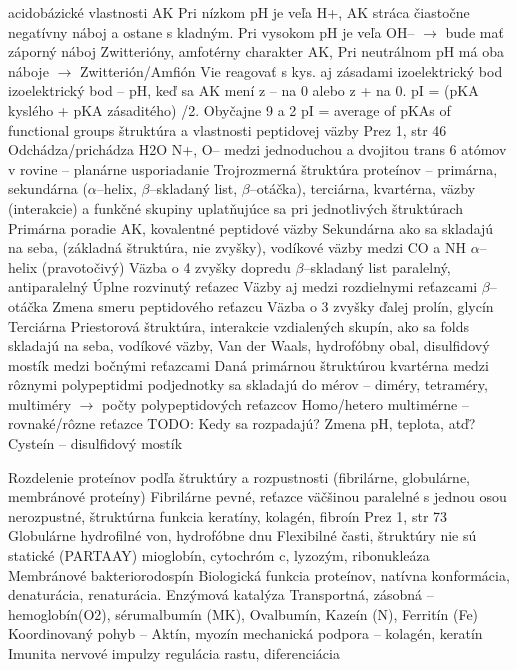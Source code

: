 acidobázické vlastnosti AK
Pri nízkom pH je veľa H+, AK stráca čiastočne negatívny náboj a ostane s kladným. 
Pri vysokom pH je veľa OH-- $\rightarrow$ bude mať záporný náboj
Zwitterióny, amfotérny charakter AK, 
Pri neutrálnom pH má oba náboje $\rightarrow$ Zwitterión/Amfión
Vie reagovať s kys. aj zásadami
izoelektrický bod                   
izoelektrický bod -- pH, keď sa AK mení z -- na 0 alebo z + na 0.
    pI = (pKA kyslého + pKA zásaditého) /2. Obyčajne 9 a 2
    pI = average of pKAs of functional groups
štruktúra a vlastnosti peptidovej väzby
Prez 1, str 46
Odchádza/prichádza H2O
N+, O--
medzi jednoduchou a dvojitou
trans
6 atómov v rovine -- planárne usporiadanie
Trojrozmerná štruktúra proteínov -- primárna, sekundárna ($\alpha$--helix, $\beta$--skladaný list, $\beta$--otáčka), terciárna, kvartérna, 
väzby (interakcie) a funkčné skupiny uplatňujúce sa pri jednotlivých štruktúrach
Primárna
poradie AK, kovalentné peptidové väzby
Sekundárna
ako sa skladajú na seba, (základná štruktúra, nie zvyšky), vodíkové väzby medzi CO a NH
$\alpha$--helix (pravotočivý)
    Väzba o 4 zvyšky dopredu
$\beta$--skladaný list
paralelný, antiparalelný
Úplne rozvinutý reťazec
Väzby aj medzi rozdielnymi reťazcami
$\beta$--otáčka
    Zmena smeru peptidového reťazcu
    Väzba o 3 zvyšky ďalej
prolín, glycín
Terciárna
Priestorová štruktúra, interakcie vzdialených skupín, ako sa folds skladajú na seba, vodíkové väzby, Van der Waals, hydrofóbny obal, disulfidový mostík medzi bočnými reťazcami
Daná primárnou štruktúrou
kvartérna
    medzi rôznymi polypeptidmi
    podjednotky sa skladajú do mérov -- diméry, tetraméry, multiméry $\rightarrow$ počty polypeptidových reťazcov
    Homo/hetero multimérne -- rovnaké/rôzne reťazce
TODO: Kedy sa rozpadajú? Zmena pH, teplota, atď?
Cysteín -- disulfidový mostík

Rozdelenie proteínov podľa štruktúry a rozpustnosti (fibrilárne, globulárne, membránové proteíny)     
Fibrilárne
pevné, reťazce väčšinou paralelné s jednou osou
nerozpustné, štruktúrna funkcia
keratíny, kolagén, fibroín
Prez 1, str 73
Globulárne
hydrofilné von, hydrofóbne dnu
Flexibilné časti, štruktúry nie sú statické (PARTAAY)
mioglobín, cytochróm c, lyzozým, ribonukleáza
Membránové
    bakteriorodospín
Biologická funkcia proteínov, natívna konformácia, denaturácia, renaturácia. 
Enzýmová katalýza
Transportná, zásobná -- hemoglobín(O2), sérumalbumín (MK), Ovalbumín, Kazeín (N), Ferritín (Fe)
Koordinovaný pohyb -- Aktín, myozín
mechanická podpora -- kolagén, keratín
Imunita
nervové impulzy
regulácia rastu, diferenciácia
                   
